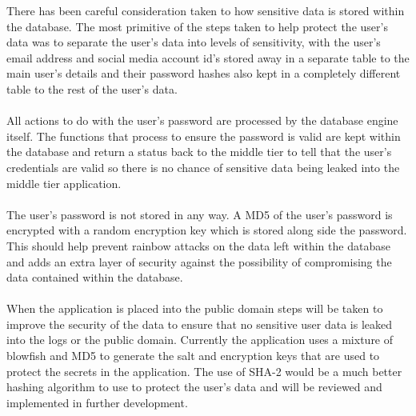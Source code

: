 There has been careful consideration taken to how sensitive data is stored within the database. The most primitive of the steps taken to help protect the user's data was to separate the user's data into levels of sensitivity, with the user's email address and social media account id's stored away in a separate table to the main user's details and their password hashes also kept in a completely different table to the rest of the user's data.\\
\\
All actions to do with the user's password are processed by the database engine itself. The functions that process to ensure the password is valid are kept within the database and return a status back to the middle tier to tell that the user's credentials are valid so there is no chance of sensitive data being leaked into the middle tier application.\\
\\
The user's password is not stored in any way. A MD5 of the user's password is encrypted with a random encryption key which is stored along side the password. This should help prevent rainbow attacks on the data left within the database and adds an extra layer of security against the possibility of compromising the data contained within the database.\\
\\
When the application is placed into the public domain steps will be taken to improve the security of the data to ensure that no sensitive user data is leaked into the logs or the public domain. Currently the application uses a mixture of blowfish and MD5 to generate the salt and encryption keys that are used to protect the secrets in the application. The use of SHA-2 would be a much better hashing algorithm to use to protect the user's data and will be reviewed and implemented in further development.


